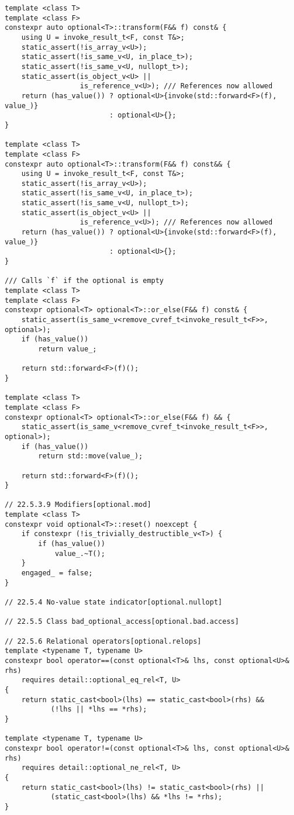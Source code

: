 \documentclass[a4paper,10pt,oneside,openany,final,article]{memoir}
\begin{document}
\begin{verbatim}
template <class T>
template <class F>
constexpr auto optional<T>::transform(F&& f) const& {
    using U = invoke_result_t<F, const T&>;
    static_assert(!is_array_v<U>);
    static_assert(!is_same_v<U, in_place_t>);
    static_assert(!is_same_v<U, nullopt_t>);
    static_assert(is_object_v<U> ||
                  is_reference_v<U>); /// References now allowed
    return (has_value()) ? optional<U>{invoke(std::forward<F>(f), value_)}
                         : optional<U>{};
}

template <class T>
template <class F>
constexpr auto optional<T>::transform(F&& f) const&& {
    using U = invoke_result_t<F, const T&>;
    static_assert(!is_array_v<U>);
    static_assert(!is_same_v<U, in_place_t>);
    static_assert(!is_same_v<U, nullopt_t>);
    static_assert(is_object_v<U> ||
                  is_reference_v<U>); /// References now allowed
    return (has_value()) ? optional<U>{invoke(std::forward<F>(f), value_)}
                         : optional<U>{};
}

/// Calls `f` if the optional is empty
template <class T>
template <class F>
constexpr optional<T> optional<T>::or_else(F&& f) const& {
    static_assert(is_same_v<remove_cvref_t<invoke_result_t<F>>, optional>);
    if (has_value())
        return value_;

    return std::forward<F>(f)();
}

template <class T>
template <class F>
constexpr optional<T> optional<T>::or_else(F&& f) && {
    static_assert(is_same_v<remove_cvref_t<invoke_result_t<F>>, optional>);
    if (has_value())
        return std::move(value_);

    return std::forward<F>(f)();
}

// 22.5.3.9 Modifiers[optional.mod]
template <class T>
constexpr void optional<T>::reset() noexcept {
    if constexpr (!is_trivially_destructible_v<T>) {
        if (has_value())
            value_.~T();
    }
    engaged_ = false;
}

// 22.5.4 No-value state indicator[optional.nullopt]

// 22.5.5 Class bad_optional_access[optional.bad.access]

// 22.5.6 Relational operators[optional.relops]
template <typename T, typename U>
constexpr bool operator==(const optional<T>& lhs, const optional<U>& rhs)
    requires detail::optional_eq_rel<T, U>
{
    return static_cast<bool>(lhs) == static_cast<bool>(rhs) &&
           (!lhs || *lhs == *rhs);
}

template <typename T, typename U>
constexpr bool operator!=(const optional<T>& lhs, const optional<U>& rhs)
    requires detail::optional_ne_rel<T, U>
{
    return static_cast<bool>(lhs) != static_cast<bool>(rhs) ||
           (static_cast<bool>(lhs) && *lhs != *rhs);
}


\end{verbatim}
\end{document}

